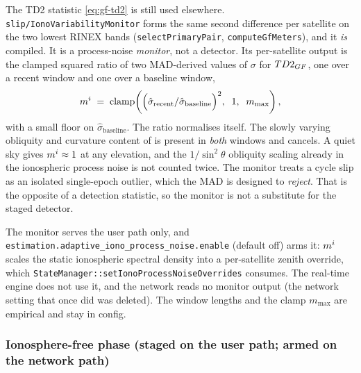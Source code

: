 \documentclass[main.tex]{subfiles}
\begin{document}
The TD2 statistic \eqref{eq:gf-td2} is still used elsewhere.
\texttt{slip/IonoVariabilityMonitor} forms the same second difference
per satellite on the two lowest RINEX bands
(\texttt{selectPrimaryPair}, \texttt{computeGfMeters}), and it \emph{is}
compiled.  It is a process-noise \emph{monitor}, not a detector.  Its
per-satellite output is the clamped squared ratio of two MAD-derived
values of $\sigma$ for $TD2_{GF}$, one over a recent window
and one over a baseline window,
\begin{equation}
m^i
\;=\;
\operatorname{clamp}\!\left(
\Bigl(\hat\sigma_{\text{recent}} / \hat\sigma_{\text{baseline}}\Bigr)^{2},
\;\; 1, \;\; m_{\max}\right),
\end{equation}
with a small floor on $\hat\sigma_{\text{baseline}}$.
The ratio normalises itself.  The slowly varying obliquity and curvature
content of  is present in \emph{both} windows and cancels.  A
quiet sky gives $m^i \approx 1$ at any elevation, and the
$1/\sin^2\theta$ obliquity scaling already in the ionospheric process
noise is not counted twice.  The monitor treats a cycle slip as an
isolated single-epoch outlier, which the MAD is designed to
\emph{reject}.  That is the opposite of a detection statistic, so the
monitor is not a substitute for the staged detector.

The monitor serves the user path only, and
\texttt{estimation.adaptive\_iono\_process\_noise.enable} (default off)
arms it: $m^i$ scales the static ionospheric spectral density into a
per-satellite zenith override, which
\texttt{StateManager::setIonoProcessNoiseOverrides} consumes.  The
real-time engine does not use it, and the network reads no monitor output
(the network setting that once did was deleted).  The window lengths and the
clamp $m_{\max}$ are empirical and stay in config.

\subsubsection{Ionosphere-free phase (staged on the user path; armed on the network path)}\label{sec:slip-if}
\end{document}
